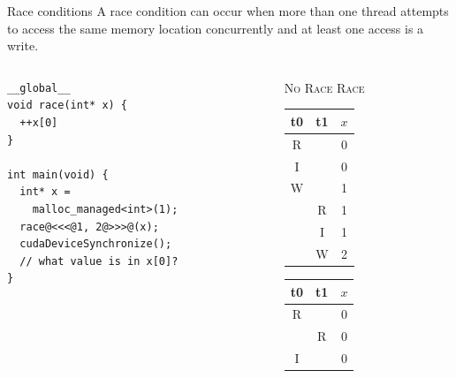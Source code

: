 \documentclass[aspectratio=43]{beamer}
\begin{document}
\begin{frame}[fragile]{Race conditions}
        A race condition can occur when more than one thread attempts to access the same memory location concurrently and at least one access is a write.

\begin{columns}[T]
    \begin{column}{0.45\textwidth}
    \begin{code}{}
        \begin{lstlisting}[style=boxcudatiny]
__global__
void race(int* x) {
  ++x[0]
}

int main(void) {
  int* x =
    malloc_managed<int>(1);
  race@<<<@1, 2@>>>@(x);
  cudaDeviceSynchronize();
  // what value is in x[0]?
}
        \end{lstlisting}
    \end{code}
    \end{column}
    \begin{column}[T]{0.55\textwidth}
        \begin{center}\scriptsize
            \vspace{-0.7cm}
            \textsc{No Race} \hspace{1.5cm} \textsc{Race} \\
            \vspace{0.1cm}
        \begin{tabular}[]{|ccc|}
            \hline
             t0 &  t1 &  $x$ \\
            \hline
              R   &      &  0\\
              I   &      &  0\\
              W   &      &  1\\
                  & R    &  1\\
                  & I    &  1\\
                  & W    &  2\\
            \hline
        \end{tabular}
        \hspace{0.5cm}
        \begin{tabular}[]{|ccc|}
            \hline
             t0 &  t1 &  $x$ \\
            \hline
              R   &      &  0\\
                  &  R   &  0\\
              I   &      &  0\\

\end{tabular}
\end{center}
\end{column}
\end{columns}
\end{frame}
\end{document}
